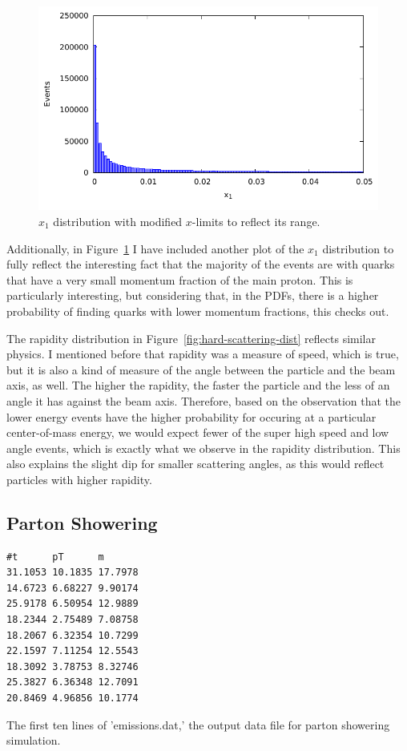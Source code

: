 \begin{figure}[ht]
  \centering
  \includegraphics[width=0.75\linewidth]{./res/gfx/results/x1_new.pdf}
  \caption{$x_1$ distribution with modified $x$-limits to reflect its range.}
  \label{fig:x1-new}
\end{figure}

Additionally, in Figure~\ref{fig:x1-new} I have included another plot of the $x_1$ distribution to fully reflect the interesting fact that the majority of the events are with quarks that have a very small momentum fraction of the main proton. This is particularly interesting, but considering that, in the PDFs, there is a higher probability of finding quarks with lower momentum fractions, this checks out.

The rapidity distribution in Figure~\ref{fig:hard-scattering-dist} reflects similar physics. I mentioned before that rapidity was a measure of speed, which is true, but it is also a kind of measure of the angle between the particle and the beam axis, as well. The higher the rapidity, the faster the particle and the less of an angle it has against the beam axis. Therefore, based on the observation that the lower energy events have the higher probability for occuring at a particular center-of-mass energy, we would expect fewer of the super high speed and low angle events, which is exactly what we observe in the rapidity distribution. This also explains the slight dip for smaller scattering angles, as this would reflect particles with higher rapidity.


\subsection{Parton Showering}

\begin{listing}[!ht]
\begin{verbatim}
#t      pT      m
31.1053 10.1835 17.7978	
14.6723 6.68227 9.90174	
25.9178 6.50954 12.9889	
18.2344 2.75489 7.08758	
18.2067 6.32354 10.7299	
22.1597 7.11254 12.5543	
18.3092 3.78753 8.32746	
25.3827 6.36348 12.7091	
20.8469 4.96856 10.1774	
\end{verbatim}
\caption{The first ten lines of 'emissions.dat,' the output data file for parton showering simulation.}
\label{listing:emissions-dat}
\end{listing}


